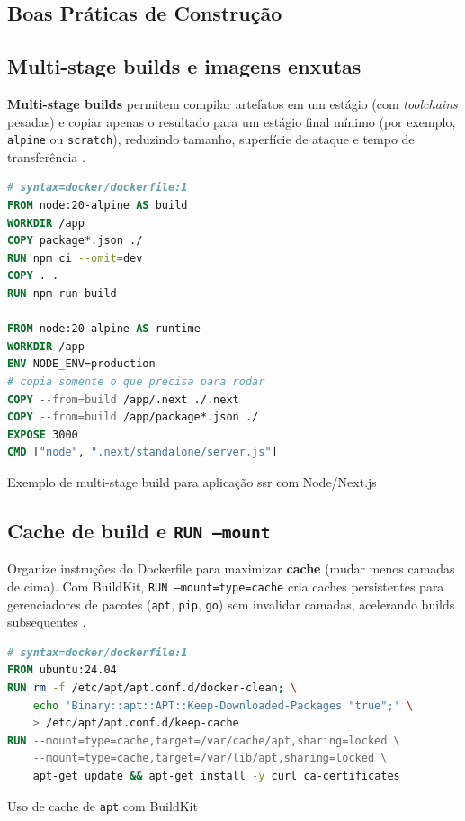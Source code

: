 \subsection{Boas Práticas de Construção}
\label{sec:docker-best-practices}

\subsection{Multi-stage builds e imagens enxutas}
\label{subsec:multi-stage}

\textbf{Multi-stage builds} permitem compilar artefatos em um estágio (com \textit{toolchains} pesadas) e copiar apenas o resultado para um estágio final mínimo (por exemplo, \texttt{alpine} ou \texttt{scratch}), reduzindo tamanho, superfície de ataque e tempo de transferência \cite{dockerfile_ref}.

\begin{codigo}[H]
\begin{lstlisting}[language=Dockerfile]
# syntax=docker/dockerfile:1
FROM node:20-alpine AS build
WORKDIR /app
COPY package*.json ./
RUN npm ci --omit=dev
COPY . .
RUN npm run build

FROM node:20-alpine AS runtime
WORKDIR /app
ENV NODE_ENV=production
# copia somente o que precisa para rodar
COPY --from=build /app/.next ./.next
COPY --from=build /app/package*.json ./
EXPOSE 3000
CMD ["node", ".next/standalone/server.js"]
\end{lstlisting}
\caption{Exemplo de multi-stage build para aplicação \acrshort{ssr} com Node/Next.js}
\label{lst:dockerfile-multistage}
\end{codigo}

\subsection{Cache de build e \texttt{RUN --mount}}
\label{subsec:cache-build}

Organize instruções do Dockerfile para maximizar \textbf{cache} (mudar menos camadas de cima). Com BuildKit, \texttt{RUN --mount=type=cache} cria caches persistentes para gerenciadores de pacotes (\texttt{apt}, \texttt{pip}, \texttt{go}) sem invalidar camadas, acelerando builds subsequentes \cite{dockerfile_ref}. 

\begin{codigo}[H]
\begin{lstlisting}[language=Dockerfile]
# syntax=docker/dockerfile:1
FROM ubuntu:24.04
RUN rm -f /etc/apt/apt.conf.d/docker-clean; \
    echo 'Binary::apt::APT::Keep-Downloaded-Packages "true";' \
    > /etc/apt/apt.conf.d/keep-cache
RUN --mount=type=cache,target=/var/cache/apt,sharing=locked \
    --mount=type=cache,target=/var/lib/apt,sharing=locked \
    apt-get update && apt-get install -y curl ca-certificates
\end{lstlisting}
\caption{Uso de cache de \texttt{apt} com BuildKit}
\label{lst:dockerfile-cache}
\end{codigo}

